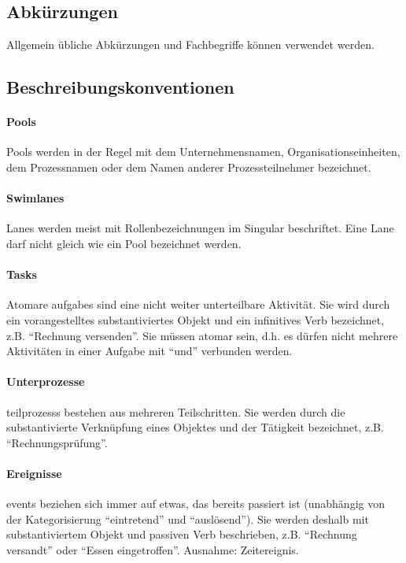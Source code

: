\documentclass[12pt,report]{snetTeaching}
\begin{document}
\subsection{Abkürzungen}

Allgemein übliche Abkürzungen und Fachbegriffe können verwendet werden.

\subsection{Beschreibungskonventionen}


\paragraph{Pools}
Pools werden in der Regel mit dem Unternehmensnamen, Organisationseinheiten, dem Prozessnamen oder dem Namen anderer Prozessteilnehmer bezeichnet.

\paragraph{Swimlanes}
Lanes werden meist mit Rollenbezeichnungen im Singular beschriftet. Eine Lane darf nicht gleich wie ein Pool bezeichnet werden.

\paragraph{Tasks} Atomare \glspl{aufgabe} sind eine nicht weiter unterteilbare Aktivität. Sie wird durch ein vorangestelltes substantiviertes Objekt und ein infinitives Verb bezeichnet, z.B. "`Rechnung versenden"'. Sie müssen atomar sein, d.h. es dürfen nicht mehrere Aktivitäten in einer Aufgabe mit "`und"' verbunden werden.

\paragraph{Unterprozesse} \glspl{teilprozess} bestehen aus mehreren Teilschritten. Sie werden durch die substantivierte Verknüpfung eines Objektes und der Tätigkeit bezeichnet, z.B. "`Rechnungsprüfung"'.

\paragraph{Ereignisse} \glspl{event} beziehen sich immer auf etwas, das bereits passiert ist (unabhängig von der Kategorisierung "`eintretend"' und "`auslösend"'). Sie werden deshalb mit substantiviertem Objekt und passiven Verb beschrieben, z.B. "`Rechnung versandt"' oder "`Essen eingetroffen"'. Ausnahme: Zeitereignis.
\end{document}
